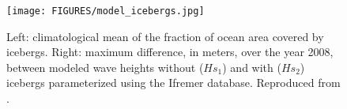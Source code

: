 \begin{figure}%
\begin{center}
 \texttt{[image: FIGURES/model\_icebergs.jpg]}
 \caption{Left: climatological mean of the fraction of ocean area covered by icebergs. Right: maximum difference, in meters, over the year 2008, between modeled wave heights without ($Hs_1$) 
and with ($Hs_2$) icebergs parameterized using the Ifremer database. Reproduced from \cite{Ardhuin&al.2011b}.\label{fig:iceberg_model}}
 \end{center}
\end{figure}
